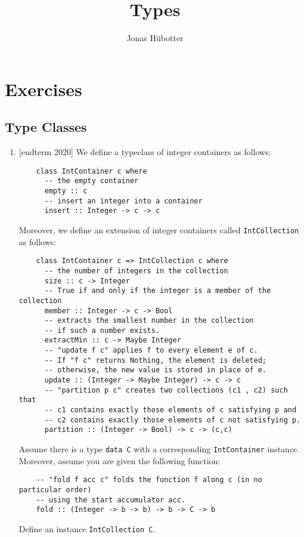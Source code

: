 \documentclass{article}
\title{Types}
\author{Jonas Hübotter}
\def\code#1{\texttt{#1}}
\begin{document}
\maketitle

\section{Exercises}

\subsection{Type Classes}
\begin{enumerate}
    \item {[endterm 2020]} We define a typeclass of integer containers as follows:
        \begin{verbatim}
    class IntContainer c where
      -- the empty container
      empty :: c
      -- insert an integer into a container
      insert :: Integer -> c -> c
        \end{verbatim}
        Moreover, we define an extension of integer containers called \code{IntCollection} as follows:
        \begin{verbatim}
    class IntContainer c => IntCollection c where
      -- the number of integers in the collection
      size :: c -> Integer
      -- True if and only if the integer is a member of the collection
      member :: Integer -> c -> Bool
      -- extracts the smallest number in the collection
      -- if such a number exists.
      extractMin :: c -> Maybe Integer
      -- "update f c" applies f to every element e of c.
      -- If "f c" returns Nothing, the element is deleted;
      -- otherwise, the new value is stored in place of e.
      update :: (Integer -> Maybe Integer) -> c -> c
      -- "partition p c" creates two collections (c1 , c2) such that
      -- c1 contains exactly those elements of c satisfying p and
      -- c2 contains exactly those elements of c not satisfying p.
      partition :: (Integer -> Bool) -> c -> (c,c)
        \end{verbatim}
        Assume there is a type \code{data C} with a corresponding \code{IntContainer} instance. Moreover, assume you are given the following function:
        \begin{verbatim}
    -- "fold f acc c" folds the function f along c (in no particular order)
    -- using the start accumulator acc.
    fold :: (Integer -> b -> b) -> b -> C -> b
        \end{verbatim}
        Define an instance \code{IntCollection C}.
\end{enumerate}
\end{document}
